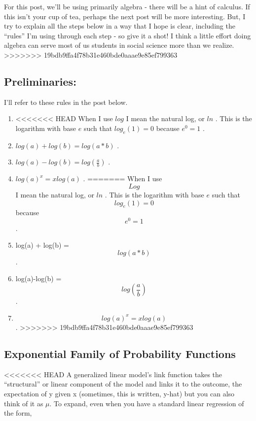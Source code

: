 \documentclass[
]{article}
\providecommand{\tightlist}{%
  \setlength{\itemsep}{0pt}\setlength{\parskip}{0pt}}
\begin{document}
For this post, we'll be using primarily algebra - there will be a hint
of calculus. If this isn't your cup of tea, perhaps the next post will
be more interesting. But, I try to explain all the steps below in a way
that I hope is clear, including the ``rules'' I'm using through each
step - so give it a shot! I think a little effort doing algebra can
serve most of us students in social science more than we realize.
>>>>>>> 19bdb9ffa4f78b31e460bde0aaae9e85ef799363

\hypertarget{preliminaries}{%
\subsection{Preliminaries:}\label{preliminaries}}

I'll refer to these rules in the post below.

\begin{enumerate}
\def\labelenumi{\arabic{enumi}.}
\tightlist
\item
<<<<<<< HEAD
  When I use \(log\) I mean the natural log, or \(ln\) . This is the
  logarithm with base \(e\) such that \(log_e(1) = 0\) because
  \(e^0 =1\) .
\item
  \(log(a) + log(b) = log(a*b)\) .
\item
  \(log(a)-log(b) = log(\frac{a}{b})\) .
\item
  \(log(a)^x = xlog(a)\) .
=======
  When I use \[Log\] I mean the natural log, or \(ln\) . This is the
  logarithm with base \(e\) such that \[log_e(1) = 0\] because
  \[e^0 =1\] .
\item
  log(a) + log(b) = \[log(a*b)\] .
\item
  log(a)-log(b) = \[log(\frac{a}{b})\] .
\item
  \[log(a)^x = xlog(a)\] .
>>>>>>> 19bdb9ffa4f78b31e460bde0aaae9e85ef799363
\end{enumerate}

\hypertarget{exponential-family-of-probability-functions}{%
\subsection{Exponential Family of Probability
Functions}\label{exponential-family-of-probability-functions}}

<<<<<<< HEAD
A generalized linear model's link function takes the ``structural'' or
linear component of the model and links it to the outcome, the
expectation of y given x (sometimes, this is written, y-hat) but you can
also think of it as \(\mu\). To expand, even when you have a standard
linear regression of the form,
\end{document}
